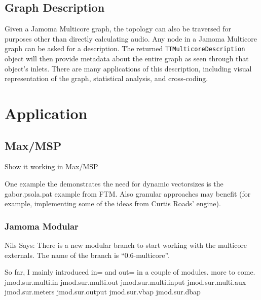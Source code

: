 \documentclass[twoside,a4paper]{article}
\begin{document}


\subsection{Graph Description} %

Given a Jamoma Multicore graph, the topology can also be traversed for purposes other than directly calculating audio.  
Any node in a Jamoma Multicore graph can be asked for a description.  The returned \texttt{TTMulticoreDescription} object will then provide 
metadata about the entire graph as seen through that object's inlets.  
There are many applications of this description, including visual representation of the graph, statistical analysis, and cross-coding.







\section{Application} %

\subsection{Max/MSP} %

Show it working in Max/MSP

One example the demonstrates the need for dynamic vectorsizes is the gabor.psola.pat example from FTM. Also granular approaches may benefit (for example, implementing some of the ideas from Curtis Roads' engine).


\subsubsection{Jamoma Modular} %


Nils Says:
There is a new modular branch to start working with the multicore 
externals. The name of the branch is ``0.6-multicore''.

So far, I mainly introduced in= and out= in a couple of modules. more to come.
jmod.sur.multi.in
jmod.sur.multi.out
jmod.sur.multi.input
jmod.sur.multi.aux
jmod.sur.meters
jmod.sur.output
jmod.sur.vbap
jmod.sur.dbap
\end{document}
